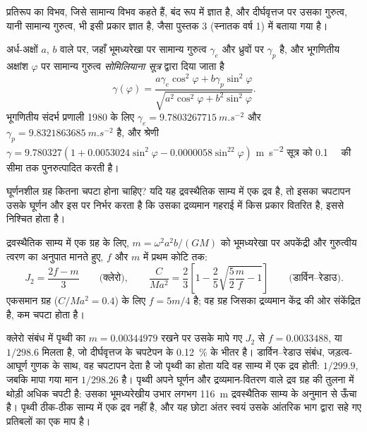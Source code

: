 प्रतिरूप का विभव, जिसे सामान्य विभव कहते हैं, बंद रूप में ज्ञात है, और
दीर्घवृत्तज पर उसका गुरुत्व, यानी सामान्य गुरुत्व, भी इसी प्रकार ज्ञात है, जैसा पुस्तक 3 (स्नातक वर्ष 1) में बताया गया है।

\begin{proposition}[सोमिलियाना सूत्र]\label{prop:b3:gravity-geodesy:somigliana}
अर्ध-अक्षों $a$, $b$ वाले  पर, जहाँ भूमध्यरेखा पर सामान्य गुरुत्व
$\gamma_e$ और ध्रुवों पर $\gamma_p$ है, और भूगणितीय अक्षांश
$\varphi$ पर सामान्य गुरुत्व \emph{सोमिलियाना
सूत्र} द्वारा दिया जाता है
\[
  \gamma(\varphi) = \frac{a\gamma_e\cos^2\varphi + b\gamma_p\sin^2\varphi}
  {\sqrt{a^2\cos^2\varphi + b^2\sin^2\varphi}} .
\]
भूगणितीय संदर्भ प्रणाली 1980 के लिए $\gamma_e = \qty{9.7803267715}{m.s^{-2}}$
और $\gamma_p = \qty{9.8321863685}{m.s^{-2}}$ है, और श्रेणी
$\gamma = 9.780327(1 + 0.0053024\sin^2\varphi - 0.0000058\sin^22\varphi)$
\unit{m.s^{-2}} सूत्र को \qty{0.1}{\milli\gal} की सीमा तक पुनरुत्पादित करती है।
\end{proposition}
\admitted

घूर्णनशील ग्रह कितना चपटा होना चाहिए? यदि यह द्रवस्थैतिक साम्य में एक द्रव है,
तो इसका चपटापन उसके घूर्णन और इस पर निर्भर करता है कि उसका द्रव्यमान
गहराई में किस प्रकार वितरित है, इससे निश्चित होता है।

\begin{proposition}[क्लेरो और डार्विन--रेडाउ संबंध]\label{prop:b3:gravity-geodesy:clairaut}
द्रवस्थैतिक साम्य में एक ग्रह के लिए, $m = \omega^2a^2b/(GM)$ को
भूमध्यरेखा पर अपकेंद्री और गुरुत्वीय त्वरण का अनुपात मानते हुए,
$f$ और $m$ में प्रथम कोटि तक:
\[
  J_2 = \frac{2f - m}{3}\qquad\text{(क्लेरो)},\qquad
  \frac{C}{Ma^2} = \frac23\left[1 - \frac25\sqrt{\frac52\frac mf - 1}\right]
  \qquad\text{(डार्विन--रेडाउ)} .
\]
एकसमान ग्रह ($C/Ma^2 = 0.4$) के लिए $f = 5m/4$ है; वह ग्रह जिसका द्रव्यमान
केंद्र की ओर संकेंद्रित है, कम चपटा होता है।
\end{proposition}
\admitted

क्लेरो संबंध में पृथ्वी का $m = \num{0.00344979}$ रखने पर उसके मापे गए
$J_2$ से $f = \num{0.0033488}$, या $1/298.6$ मिलता है,
जो दीर्घवृत्तज के चपटेपन के \qty{0.12}{\percent} के भीतर है। डार्विन--रेडाउ
संबंध, जड़त्व-आघूर्ण गुणक के साथ, वह चपटापन देता है जो पृथ्वी का
होता यदि वह साम्य में एक द्रव होती: $1/299.9$, जबकि मापा गया
मान $1/298.26$ है। पृथ्वी अपने घूर्णन और द्रव्यमान-वितरण वाले द्रव ग्रह की तुलना में
थोड़ी अधिक चपटी है: उसका भूमध्यरेखीय उभार लगभग
\qty{116}{m} द्रवस्थैतिक साम्य के अनुमान से ऊँचा है। पृथ्वी ठीक-ठीक
साम्य में एक द्रव नहीं है, और यह छोटा अंतर स्वयं
उसके आंतरिक भाग द्वारा सहे गए प्रतिबलों का एक माप है।

